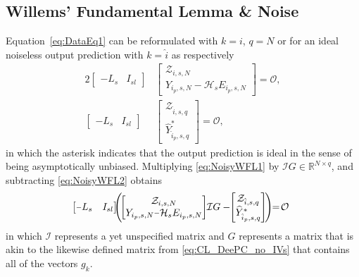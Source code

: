 \subsection{Willems' Fundamental Lemma \& Noise}
Equation~\eqref{eq:DataEq1} can be reformulated with $k=i$, $q=N$ or for an ideal noiseless output prediction with $k=\hat{i}$ as respectively
\begin{alignat}{2}
    \begin{bmatrix}
        -L_s & I_{sl}
    \end{bmatrix}&
    \begin{bmatrix}
        \mathcal{Z}_{i,s,N}\\
        Y_{i_p,s,N}-\mathcal{H}_s E_{i_p,s,N}
    \end{bmatrix} = \mathcal{O},\label{eq:NoisyWFL1}\\%
    \begin{bmatrix}
        -L_s & I_{sl}
    \end{bmatrix}&
    \begin{bmatrix}
        \mathcal{Z}_{\hat{i},s,q}\\
        \widehat{Y}^*_{\hat{i}_p,s,q}
    \end{bmatrix} = \mathcal{O}, \label{eq:NoisyWFL2}
\end{alignat}
in which the asterisk indicates that the output prediction is ideal in the sense of being asymptotically unbiased. Multiplying \eqref{eq:NoisyWFL1} by $\mathcal{I}G\in\mathbb{R}^{N\times q}$, and subtracting \eqref{eq:NoisyWFL2} obtains
\begin{align}\label{eq:NoisyWFL3}
    \mkern-14mu\begin{bmatrix}
        \shortminus L_s & I_{sl}
    \end{bmatrix}
    \mkern-9mu\left(\mkern-3mu%
    \begin{bmatrix}
        \mathcal{Z}_{i,s,N}\\
        Y_{i_p,s,N}\shortminus\mathcal{H}_s E_{i_p,s,N}
    \end{bmatrix}%
    \mkern-4mu\mathcal{I}G%
    -%
    \mkern-5mu\begin{bmatrix}
        \mathcal{Z}_{\hat{i},s,q}\\
        \widehat{Y}^*_{\hat{i}_p,s,q}
    \end{bmatrix}\mkern-3mu\right)\mkern-6mu=\mkern-3mu\mathcal{O}\mkern-5mu%
\end{align}
in which $\mathcal{I}$ represents a yet unspecified matrix and $G$ represents a matrix that is akin to the likewise defined matrix from \eqref{eq:CL_DeePC_no_IVs} that contains all of the vectors $g_k$.

